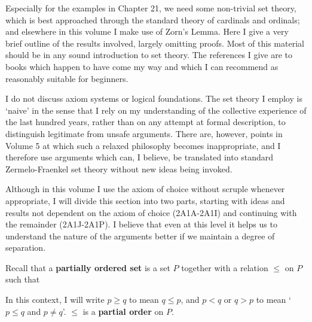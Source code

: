      
\def\chaptername{Appendix} 
\def\sectionname{Set theory} 
      
\def\Enderton{{\smc Enderton 77}} 
\def\Halmos{{\smc Halmos 60}} 
\def\Henle{{\smc Henle 86}} 
\def\Krivine{{\smc Krivine 71}} 
\def\Lipschutz{{\smc Lipschutz 64}} 
\def\Roitman{{\smc Roitman 90}} 
      
      
Especially for the examples in Chapter 21, we need some non-trivial set 
theory, which is best approached through the standard theory of 
cardinals and ordinals;  and elsewhere in this volume I make use of 
Zorn's Lemma. 
Here I give a very brief outline of the results involved, largely 
omitting proofs. 
Most of this material should be in any sound introduction to set theory. 
The references I give are to books which happen to have come my way and 
which I can recommend as reasonably suitable for beginners. 
      
I do not discuss axiom systems or logical foundations.   The set theory 
I employ is `naive' in the sense that I rely on my understanding of 
the collective experience of the last hundred years, rather than on any 
attempt at formal description, to distinguish legitimate from unsafe 
arguments.   There are, however, points in Volume 5 at which such a 
relaxed philosophy becomes inappropriate, and I therefore use arguments 
which can, I believe, be translated into standard 
Zermelo-Fraenkel set theory without new ideas being invoked. 
      
Although in this volume I use the axiom of choice without scruple 
whenever appropriate, I will divide this section into two parts, 
starting with ideas and results not dependent on the axiom of choice 
(2A1A-2A1I) and continuing with the remainder 
(2A1J-2A1P).   I believe that even at this level it helps us to 
understand the nature of the arguments better if we maintain a degree of 
separation. 
      
 Recall that a {\bf partially ordered 
set} is a set $P$ together with a relation $\le$ on $P$ such that 
      
      
\noindent In this context, I will write $p\ge q$ to mean $q\le p$, and 
$p<q$ or $q>p$ to mean `$p\le q$ and $p\ne q$'.   $\le$ is a 
{\bf partial order} on $P$. 
      
